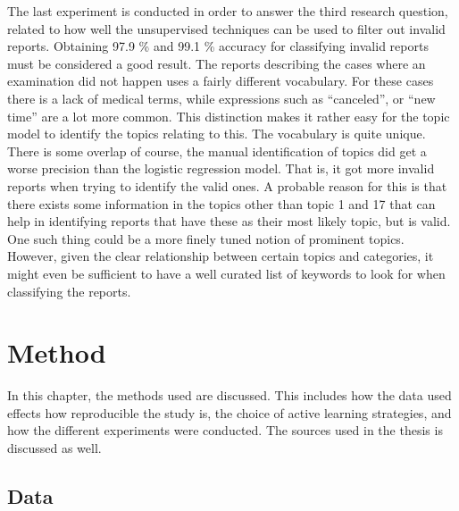 The last experiment is conducted in order to answer the third research question, related to how well the unsupervised techniques can be used to filter out invalid reports.
Obtaining 97.9 \% and 99.1 \% accuracy for classifying invalid reports must be considered a good result.
The reports describing the cases where an examination did not happen uses a fairly different vocabulary.
For these cases there is a lack of medical terms, while expressions such as ``canceled'', or ``new time'' are a lot more common.
This distinction makes it rather easy for the topic model to identify the topics relating to this.
The vocabulary is quite unique.
There is some overlap of course, the manual identification of topics did get a worse precision than the logistic regression model.
That is, it got more invalid reports when trying to identify the valid ones.
A probable reason for this is that there exists some information in the topics other than topic 1 and 17 that can help in identifying reports that have these as their most likely topic, but is valid.
One such thing could be a more finely tuned notion of prominent topics.
However, given the clear relationship between certain topics and categories, it might even be sufficient to have a well curated list of keywords to look for when classifying the reports.



\section{Method}
\label{sec:discussion-method}

In this chapter, the methods used are discussed.
This includes how the data used effects how reproducible the study is, the choice of active learning strategies,  and how the different experiments were conducted.
The sources used in the thesis is discussed as well.

\subsection{Data}

